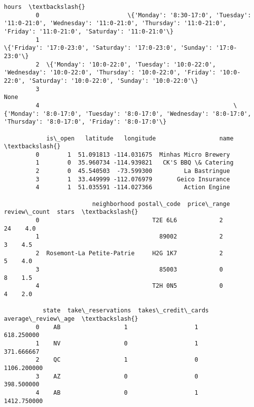 \documentclass[11pt]{article}
\begin{document}
\begin{Verbatim}[commandchars=\\\{\}]
                                                                                                                                                                                hours  \textbackslash{}
         0                         \{'Monday': '8:30-17:0', 'Tuesday': '11:0-21:0', 'Wednesday': '11:0-21:0', 'Thursday': '11:0-21:0', 'Friday': '11:0-21:0', 'Saturday': '11:0-21:0'\}   
         1                                                                                                    \{'Friday': '17:0-23:0', 'Saturday': '17:0-23:0', 'Sunday': '17:0-23:0'\}   
         2  \{'Monday': '10:0-22:0', 'Tuesday': '10:0-22:0', 'Wednesday': '10:0-22:0', 'Thursday': '10:0-22:0', 'Friday': '10:0-22:0', 'Saturday': '10:0-22:0', 'Sunday': '10:0-22:0'\}   
         3                                                                                                                                                                       None   
         4                                                       \{'Monday': '8:0-17:0', 'Tuesday': '8:0-17:0', 'Wednesday': '8:0-17:0', 'Thursday': '8:0-17:0', 'Friday': '8:0-17:0'\}   
         
            is\_open   latitude   longitude                  name  \textbackslash{}
         0        1  51.091813 -114.031675  Minhas Micro Brewery   
         1        0  35.960734 -114.939821   CK'S BBQ \& Catering   
         2        0  45.540503  -73.599300         La Bastringue   
         3        1  33.449999 -112.076979       Geico Insurance   
         4        1  51.035591 -114.027366         Action Engine   
         
                         neighborhood postal\_code  price\_range  review\_count  stars  \textbackslash{}
         0                                T2E 6L6            2            24    4.0   
         1                                  89002            2             3    4.5   
         2  Rosemont-La Petite-Patrie     H2G 1K7            2             5    4.0   
         3                                  85003            0             8    1.5   
         4                                T2H 0N5            0             4    2.0   
         
           state  take\_reservations  takes\_credit\_cards  average\_review\_age  \textbackslash{}
         0    AB                  1                   1          618.250000   
         1    NV                  0                   1          371.666667   
         2    QC                  1                   0         1106.200000   
         3    AZ                  0                   0          398.500000   
         4    AB                  0                   1         1412.750000   
         

\end{Verbatim}
\end{document}
